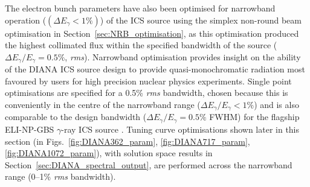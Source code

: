 \documentclass[../main.tex]{subfiles}
\begin{document}
The electron bunch parameters have also been optimised for narrowband operation ($\left(\Delta E_{\gamma}<1\%\right)$) of the ICS source using the simplex non-round beam optimisation in Section~\ref{sec:NRB_optimisation}, as this optimisation produced the highest collimated flux within the specified bandwidth of the source ($\Delta E_{\gamma}/E_{\gamma}=0.5\%$, \textit{rms}). Narrowband optimisation provides insight on the ability of the DIANA ICS source design to provide quasi-monochromatic radiation most favoured by users for high precision nuclear physics experiments. Single point optimisations are specified for a 0.5\% \textit{rms} bandwidth, chosen because this is conveniently in the centre of the narrowband range ($\Delta E_{\gamma}/E_{\gamma}<1\%$) and is also comparable to the design bandwidth ($\Delta E_{\gamma}/E_{\gamma}=0.5\%$ FWHM) for the  flagship ELI-NP-GBS $\gamma$-ray ICS source \cite{elinp2019vega}. Tuning curve optimisations shown later in this section (in Figs.~\ref{fig:DIANA362_param}, \ref{fig:DIANA717_param}, \ref{fig:DIANA1072_param}), with solution space results in Section~\ref{sec:DIANA_spectral_output}, are performed across the narrowband range (0--1\% \textit{rms} bandwidth).    
\end{document}
